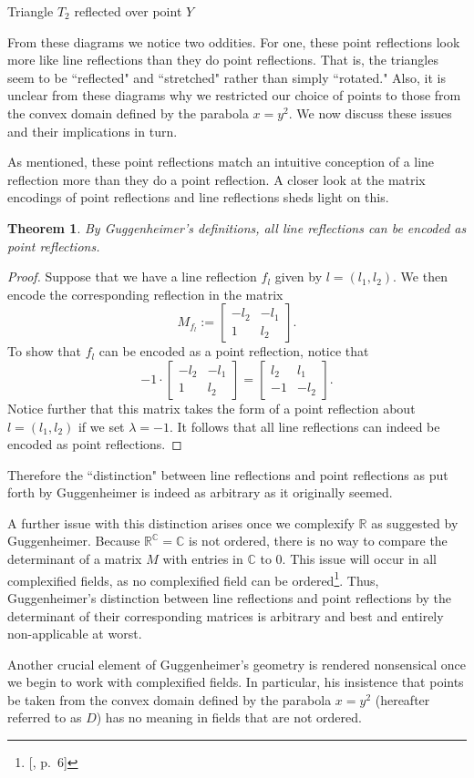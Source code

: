 \documentclass[12pt]{article}
\newcommand{\R}{\mathbb{R}}
\newcommand{\C}{\mathbb{C}}
\newcommand{\lftmat}[4]{\begin{bmatrix} {#1} & {#2} \\ {#3} & {#4} \end{bmatrix}}
\newcommand{\linenoendmat}[2]{\begin{bmatrix} -{#2} & -{#1} \\ 1 & {#2} \end{bmatrix}}
\newcommand{\stanlinenoendmat}{\linenoendmat{l_1}{l_2}}
\theoremstyle{plain}
\newtheorem{theorem}{Theorem}[section]
\theoremstyle{definition}
\begin{document}
\begin{center}
Triangle $T_2$ reflected over point $Y$ 
\end{center}
\fi


From these diagrams we notice two oddities. For one, these point reflections look more like line reflections than they do point reflections. That is, the triangles seem to be ``reflected" and ``stretched" rather than simply ``rotated." Also, it is unclear from these diagrams why we restricted our choice of points to those from the convex domain defined by the parabola $x = y^2$. We now discuss these issues and their implications in turn.

As mentioned, these point reflections match an intuitive conception of a line reflection more than they do a point reflection. A closer look at the matrix encodings of point reflections and line reflections sheds light on this. 

\begin{theorem}
By Guggenheimer's definitions, all line reflections can be encoded as point reflections. 
\end{theorem}

\begin{proof}
Suppose that we have a line reflection $f_l$ given by $l = (l_1, l_2)$. We then encode the corresponding reflection in the matrix 
\[ M_{f_l} := \stanlinenoendmat. \]
To show that $f_l$ can be encoded as a point reflection, notice that 
\[ -1 \cdot \stanlinenoendmat = \lftmat{l_2}{l_1}{-1}{-l_2}.\]
Notice further that this matrix takes the form of a point reflection about $l = (l_1, l_2)$ if we set $\lambda = -1$. It follows that all line reflections can indeed be encoded as point reflections.
\end{proof}

Therefore the ``distinction" between line reflections and point reflections as put forth by Guggenheimer is indeed as arbitrary as it originally seemed. 

A further issue with this distinction arises once we complexify $\R$ as suggested by Guggenheimer. Because $\R^{\C} = \C$ is not ordered, there is no way to compare the determinant of a matrix $M$ with entries in $\C$ to 0. This issue will occur in all complexified fields, as no complexified field can be ordered\footnote{[\cite{marsden_complex_book}, p.~6]}. Thus, Guggenheimer's distinction between line reflections and point reflections by the determinant of their corresponding matrices is arbitrary and best and entirely non-applicable at worst.

Another crucial element of Guggenheimer's geometry is rendered nonsensical once we begin to work with complexified fields. In particular, his insistence that points be taken from the convex domain defined by the parabola $x = y^2$ (hereafter referred to as $D$) has no meaning in fields that are not ordered.
\end{document}
